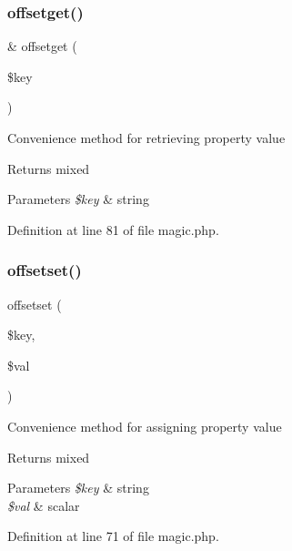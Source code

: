 \subsubsection{\texorpdfstring{offsetget()}{offsetget()}}
{\footnotesize\ttfamily \& offsetget (\begin{DoxyParamCaption}\item[{}]{\$key }\end{DoxyParamCaption})}

Convenience method for retrieving property value \begin{DoxyReturn}{Returns}
mixed 
\end{DoxyReturn}

\begin{DoxyParams}{Parameters}
{\em \$key} & string \\
\hline
\end{DoxyParams}


Definition at line 81 of file magic.\+php.

\hypertarget{class_magic_a67693a9cff0abdfbbd353c36c00fb8d3}{}\label{class_magic_a67693a9cff0abdfbbd353c36c00fb8d3} 
\subsubsection{\texorpdfstring{offsetset()}{offsetset()}}
{\footnotesize\ttfamily offsetset (\begin{DoxyParamCaption}\item[{}]{\$key,  }\item[{}]{\$val }\end{DoxyParamCaption})}

Convenience method for assigning property value \begin{DoxyReturn}{Returns}
mixed 
\end{DoxyReturn}

\begin{DoxyParams}{Parameters}
{\em \$key} & string \\
\hline
{\em \$val} & scalar \\
\hline
\end{DoxyParams}


Definition at line 71 of file magic.\+php.

\hypertarget{class_magic_a414cd1cb3c09fc06e5e83502f6309dde}{}\label{class_magic_a414cd1cb3c09fc06e5e83502f6309dde} 
